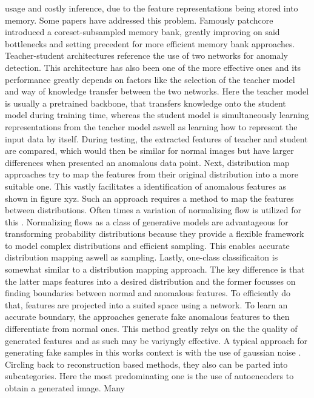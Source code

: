 usage and costly inference, due to the feature representations being stored into memory. Some papers have addressed this problem. Famously patchcore \cite{patchCore2022} introduced a coreset-subsampled 
memory bank, greatly improving on said bottlenecks and setting precedent for more efficient memory bank approaches. Teacher-student architectures reference the use of two networks for anomaly detection. 
This architecture has also been one of the more effective ones and its performance greatly depends on factors like the selection of the teacher model and way 
of knowledge transfer between the two networks. Here the teacher model is usually a pretrained 
backbone, that transfers knowledge onto the student model during training time, whereas the student model is simultaneously learning representations from the teacher model aswell as learning 
how to represent the input data by itself. During testing, the extracted features of teacher and student are compared, which would then be similar for normal images but have larger differences 
when presented an anomalous data point.
Next, distribution map approaches try to map the features from their original distribution into a more suitable one. This vastly facilitates a identification of anomalous features as shown in 
figure xyz. Such an approach requires a method to map the features between distributions. Often times a variation of normalizing flow is utilized for this \cite{liu2024deep}. 
Normalizing flows as a class of generative models \cite{Kobyzev_2021normalizingflowexplanation} are advantageous for transforming probability distributions because they provide a flexible 
framework to model complex distributions and efficient sampling. This enables accurate distribution mapping aswell as sampling. 
Lastly, one-class classificaiton is 
somewhat similar to a distribution mapping approach. The key difference is that the latter maps features into a desired distribution and the former focusses on finding boundaries between normal 
and anomalous features. To efficiently do that, features are projected into a suited space using a network. To learn an accurate boundary, the approaches generate fake anomalous features to 
then differentiate from normal ones. This method greatly relys on the the quality of generated features and as such may be variyngly effective. A typical approach for generating fake samples 
in this works context is with the use of gaussian noise \cite{liu2023simplenet}.
\newline
Circling back to reconstruction based methods, they also can be parted into subcategories. Here the most predominating one is the use of autoencoders to obtain a generated image. Many 

